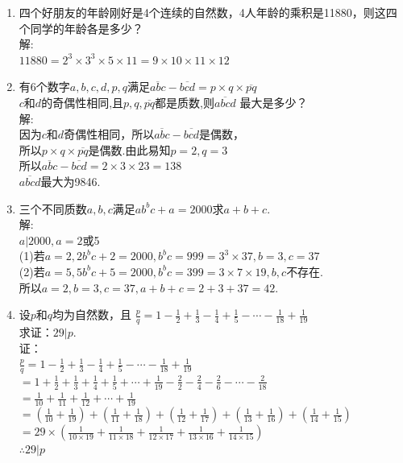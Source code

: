 \documentclass[12pt,oneside,a4paper]{ctexbook} %
\numberwithin{chapter}{part}
\begin{document}
\begin{enumerate}
\item 
四个好朋友的年龄刚好是4个连续的自然数，4人年龄的乘积是11880，则这四个同学的年龄各是多少？\\
解:\\
$11880=2^3\times3^3\times5\times11=9\times10\times11\times12$

\item 
有6个数字$a,b,c,d,p,q$满足$\overline{abc}-\overline{bcd}=p\times q\times\overline{pq}$\\
$c$和$d$的奇偶性相同,且$p,q,\overline{pq}$都是质数,则$\overline{abcd}$ 最大是多少？\\
解:\\
因为$c$和$d$奇偶性相同，所以$\overline{abc}-\overline{bcd}$是偶数，\\
所以$p\times q\times \overline{pq}$是偶数.由此易知$p=2,q=3$\\
所以$\overline{abc}-\overline{bcd}=2\times3\times23=138$\\
$\overline{abcd}$最大为9846.

\item 
三个不同质数$a,b,c$满足$ab^bc+a=2000$求$a+b+c$.\\
解:\\
$a|2000,a=2$或5\\
(1)若$a=2,2b^bc+2=2000,b^bc=999=3^3\times37,b=3,c=37$\\
(2)若$a=5,5b^bc+5=2000,b^bc=399=3\times7\times19,b,c$不存在.\\
所以$a=2,b=3,c=37,a+b+c=2+3+37=42$.

\item 
设$p$和$q$均为自然数，且
$\frac{p}{q}=1-\frac{1}{2}+\frac{1}{3}-\frac{1}{4}+\frac{1}{5}-\cdots-\frac{1}{18}+\frac{1}{19}$\\
求证：$29|p$.\\
证：\\
$\frac{p}{q}=1-\frac{1}{2}+\frac{1}{3}-\frac{1}{4}+\frac{1}{5}-\cdots-\frac{1}{18}+\frac{1}{19}$\\
$=1+\frac{1}{2}+\frac{1}{3}+\frac{1}{4}+\frac{1}{5}+\cdots+\frac{1}{19}-\frac{2}{2}-\frac{2}{4}-\frac{2}{6}-\cdots-\frac{2}{18}$\\
$=\frac{1}{10}+\frac{1}{11}+\frac{1}{12}+\cdots+\frac{1}{19}$\\
$=(\frac{1}{10}+\frac{1}{19})+(\frac{1}{11}+\frac{1}{18})+(\frac{1}{12}+\frac{1}{17})+(\frac{1}{13}+\frac{1}{16})+(\frac{1}{14}+\frac{1}{15})$\\
$=29\times(\frac{1}{10\times19}+\frac{1}{11\times18}+\frac{1}{12\times17}+\frac{1}{13\times16}+\frac{1}{14\times15})$\\
$\therefore 29|p$


\end{enumerate}
\end{document}
